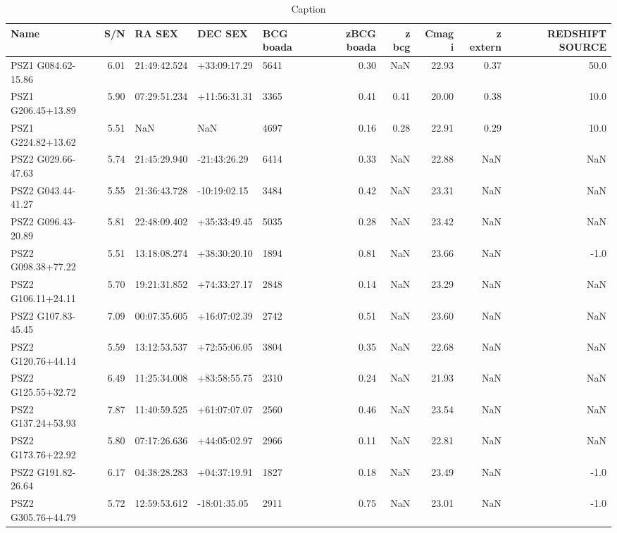 \documentclass[apj, revtex4-1]{emulateapj}
\begin{document}
\begin{table}
	\caption[Caption]{Caption}
	\begin{tabular}{lrlllrrrrr}
	\hline
	 Name &  S/N &        RA SEX &       DEC SEX & BCG boada &  zBCG boada &  z bcg &  Cmag i &  z extern &  REDSHIFT SOURCE \\
	\hline
 PSZ1 G084.62-15.86 & 6.01 &  21:49:42.524 &  +33:09:17.29 &      5641 &        0.30 &    NaN &   22.93 &      0.37 &             50.0 \\
 PSZ1 G206.45+13.89 & 5.90 &  07:29:51.234 &  +11:56:31.31 &      3365 &        0.41 &   0.41 &   20.00 &      0.38 &             10.0 \\
 PSZ1 G224.82+13.62 & 5.51 &           NaN &           NaN &      4697 &        0.16 &   0.28 &   22.91 &      0.29 &             10.0 \\
 PSZ2 G029.66-47.63 & 5.74 &  21:45:29.940 &  -21:43:26.29 &      6414 &        0.33 &    NaN &   22.88 &       NaN &              NaN \\
 PSZ2 G043.44-41.27 & 5.55 &  21:36:43.728 &  -10:19:02.15 &      3484 &        0.42 &    NaN &   23.31 &       NaN &              NaN \\
 PSZ2 G096.43-20.89 & 5.81 &  22:48:09.402 &  +35:33:49.45 &      5035 &        0.28 &    NaN &   23.42 &       NaN &              NaN \\
 PSZ2 G098.38+77.22 & 5.51 &  13:18:08.274 &  +38:30:20.10 &      1894 &        0.81 &    NaN &   23.66 &       NaN &             -1.0 \\
 PSZ2 G106.11+24.11 & 5.70 &  19:21:31.852 &  +74:33:27.17 &      2848 &        0.14 &    NaN &   23.29 &       NaN &              NaN \\
 PSZ2 G107.83-45.45 & 7.09 &  00:07:35.605 &  +16:07:02.39 &      2742 &        0.51 &    NaN &   23.60 &       NaN &              NaN \\
 PSZ2 G120.76+44.14 & 5.59 &  13:12:53.537 &  +72:55:06.05 &      3804 &        0.35 &    NaN &   22.68 &       NaN &              NaN \\
 PSZ2 G125.55+32.72 & 6.49 &  11:25:34.008 &  +83:58:55.75 &      2310 &        0.24 &    NaN &   21.93 &       NaN &              NaN \\
 PSZ2 G137.24+53.93 & 7.87 &  11:40:59.525 &  +61:07:07.07 &      2560 &        0.46 &    NaN &   23.54 &       NaN &              NaN \\
 PSZ2 G173.76+22.92 & 5.80 &  07:17:26.636 &  +44:05:02.97 &      2966 &        0.11 &    NaN &   22.81 &       NaN &              NaN \\
 PSZ2 G191.82-26.64 & 6.17 &  04:38:28.283 &  +04:37:19.91 &      1827 &        0.18 &    NaN &   23.49 &       NaN &             -1.0 \\
 PSZ2 G305.76+44.79 & 5.72 &  12:59:53.612 &  -18:01:35.05 &      2911 &        0.75 &    NaN &   23.01 &       NaN &             -1.0 \\
 	\hline
	\end{tabular}
\label{tbl:results}
\end{table}
\end{document}

